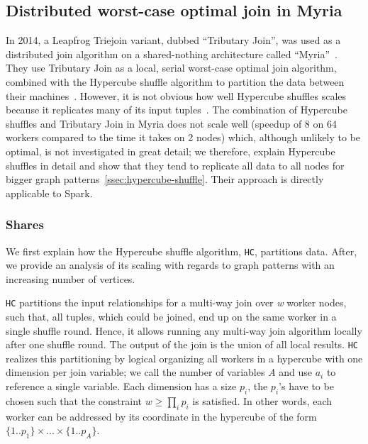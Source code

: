 \subsection{Distributed worst-case optimal join in Myria}
In 2014, a Leapfrog Triejoin variant, dubbed ``Tributary Join'', was used as a distributed join algorithm on a shared-nothing architecture called ``Myria''~\cite{myria-detailed}.
They use Tributary Join as a local, serial worst-case optimal join algorithm, combined with the Hypercube shuffle algorithm to partition the data between their machines~\cite{hypercube}.
However, it is not obvious how well Hypercube shuffles scales because it replicates many of its input tuples~\cite{myria-detailed}.
The combination of Hypercube shuffles and Tributary Join in Myria does not scale well (speedup of 8 on 64 workers compared to the time it takes on 2 nodes) which, although unlikely to be optimal, is not investigated in great detail; we therefore, explain Hypercube shuffles in detail and show that they tend to replicate all data to all nodes for bigger graph patterns~\cref{ssec:hypercube-shuffle}.
Their approach is directly applicable to Spark.

\subsubsection{Shares}
We first explain how the Hypercube shuffle algorithm, \texttt{HC}, partitions data.
After, we provide an analysis of its scaling with regards to graph patterns with an increasing number of vertices.

\texttt{HC} partitions the input relationships for a multi-way join over \textit{w} worker nodes, such that, all tuples, which could be joined, end up on the same worker in a single shuffle round.
Hence, it allows running any multi-way join algorithm locally after one shuffle round.
The output of the join is the union of all local results.
\texttt{HC} realizes this partitioning by logical organizing all workers in a hypercube with one dimension per join variable; we call the number of variables \textit{A} and use $a_i$ to reference a single variable.
Each dimension has a size $p_i$, the $p_i$'s have to be chosen such that the constraint $w \ge \prod_{i}p_i$ is satisfied.  %
In other words, each worker can be addressed by its coordinate in the hypercube of the form $\{1..p_1\} \times ... \times \{1..p_A\}$.

